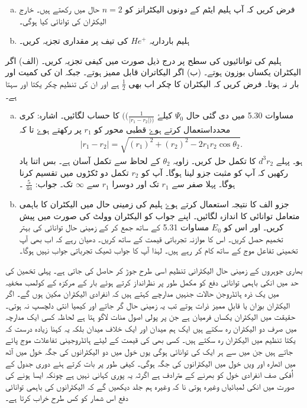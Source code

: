 \begin{enumerate}[a.]
\item
فرض کریں کہ آپ ہلیم ایٹم کے دونوں الیکٹرانز کو $ n=2 $ حال میں رکھتے ہیں۔ خارج الیکٹران کی توانائی کیا ہوگی۔
\item
ہلیم بارداریہ $ He^+ $ کی تیف پر مقداری تجزیہ کریں۔ 
\end{enumerate}
ہلیم کی توانائیوں کی سطح پر درج ذیل صورت میں کیفی تجزیہ کریں۔ (الف) اگر الیکٹران یکساں بوزون ہوتے۔ (ب) اگر الیکاتران قابل ممیز ہوتے۔ جبکہ ان کی کمیت اور بار نہ ہوتا۔ فرض کریں کہ الیکٹران کا چکر اب بھی $ \frac{1}{2} $ 
ہے اور ان کی تنظیم چکر یکتا اور سہتا ہے۔
\begin{enumerate}[a.]
\item
مساوات 5.30 میں دی گئی حال $ \Psi_{0} $  کیلۓ  $ ((\frac{1}{|r_{1} - r_{2} |))} $ کا حساب لگائیں۔ اشارہ: کری محدداستعمال کرتے ہوۓ قطبی محور کو $ r_{1} $ پر رکھتے ہوۓ تا کہ
\begin{align}
|r_{1}-r_{2}|= \sqrt{(r_{1})^2+ (r_{2})^2 -2r_{1} r_{2}\cos\theta_{2}}.
\end{align}
ہو۔ پہلے 
$ d^3 r_{2} $
  کا تکمل حل کریں۔ زاویہ 
  $ \theta_{2} $
   کے لحاظ سے تکمل آسان ہے۔ بس اتنا یاد رکھیں کہ آپ کو مثبت جزو لینا ہوگا۔ آپ کو  
   $ r_{2} $
    تکمل دو ٹکڑوں میں تقسیم کرنا ہوگا۔ پہلا صفر سے 
    $ r_{1} $ 
    تک اور دوسرا 
     $ r_{1} $ سے $ \infty $ تک۔ جواب: $\frac{5}{4a} $ ۔ 
\item
جزو الف کا نتیجہ استعمال کرتے ہوۓ ہلیم کی زمینی حال میں الیکٹران کا باہمی متعامل توانائی کا اندازہ لگائیں۔ اپنے جواب کو الیکٹران وولٹ کی صورت میں پیش کریں۔ اور اس کو $ E_{0} $ مساوات 5.31 کے ساتھ جمع کر کے زمینی حال توانائی کی بہتر تخمیم حصل کریں۔ اس کا موازنہ تجرباتی قیمت کے ساتھ کریں۔ دھیان رہے کہ اب بھی آپ تخمینی تفاعل موج کے ساتھ کام کر رہے ہیں۔ لہذا آپ کا جواب ٹھیک تجرباتی جواب نہیں ہوگا۔  
\end{enumerate}


بھاری جوہروں کے زمینی حال الیکٹرانی تنظیم اسی طرح جوڑ کر حاصل کی جاتی ہے۔ پہلی تخمین کی حد میں انکی باہمی توانائی دفع کو مکمل طور پر نظرانداز کرتے ہوئے بار  کے مرکزہ کے کولمب مخفیہ میں یک ذرہ ہائڈروجن حالات  جنہیں مدارچے کہتے ہیں کہ انفرادی الیکٹران مکین ہوں گے۔ اگر الیکٹران بوزان یا قابلِ ممیز ذرات ہوتے تب یہ زمینی حال  گر جاتے اور کیمیا انتی دلچسپ نہ ہوتی۔ حقیقت میں الیکٹران یکساں فرمیان ہے جن پر پولی اصول منات لاگو ہتا ہے لحاظہ کسی ایک مدارچہ میں صرف دو الیکٹران رہ سکتے ہیں ایک ہم میدان اور ایک خلاف میدان بلکہ یہ کہنا زیادہ درست کہ یکتا تنظیم میں الیکٹران رہ سکتے ہیں۔ کسی بھی  کی قیمت کے لیئے  ہائڈروجینی تفاعلات موج پائے جاتے ہیں جن میں سے ہر ایک کی توانائی  ہوگی یوں  خول میں دو الیکٹرانوں کی جگہ  خول میں آٹھ  میں اٹھارہ اور ویں خول میں  الیکٹرانوں کی جگہ ہوگی۔ کیفی طور پر بات کرتے ہئے دوری جدول کے اُفکی صف انفرادی خول کو بھرنے کے مترادف ہے اگرثہ یہ پوری کہانی نہیں ہے چونکہ ایسا ہونے کی صورت میں انکی لمبائیاں  وغیرہ ہوتی نا کہ  وغیرہ ہم جلد دیکھیں گے کہ الیکٹرانوں کی باہمی توانائی دفع اس شمار کو کس طرح خراب کرتا ہے۔


